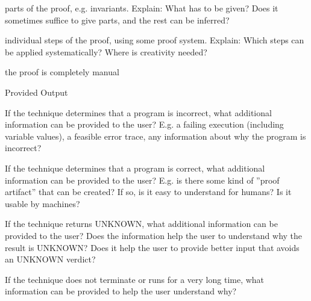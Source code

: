 \documentclass[a4paper]{article}
\begin{document}
\begin{minipage}[t]{0.16\linewidth}
\begin{betterlist}
\begin{betterlist}
			\item \checkboxUnchecked parts of the proof, e.g. invariants. Explain: What has to be given? Does it sometimes suffice to give parts, and the rest can be inferred?

			\item \checkboxUnchecked individual steps of the proof, using some proof system. Explain: Which steps can be applied systematically? Where is creativity needed?

			\item \checkboxUnchecked the proof is completely manual
		\end{betterlist}
		\item \alert{Provided Output}
		\begin{betterlist}
			\item If the technique determines that a program is incorrect, what additional information can be provided to the user? E.g. a failing execution (including variable values), a feasible error trace, any information about why the program is incorrect?

			\item If the technique determines that a program is correct, what additional information can be provided to the user? E.g. is there some kind of ”proof artifact” that can be created? If so, is it easy to understand for humans? Is it usable by machines?

			\item If the technique returns UNKNOWN, what additional information can be provided to the user? Does the information help the user to understand why the result is UNKNOWN? Does it help the user to provide better input that avoids an UNKNOWN verdict?

			\item If the technique does not terminate or runs for a very long time, what information can be provided to help the user understand why?


\end{betterlist}
\end{betterlist}
\end{minipage}
\end{document}

